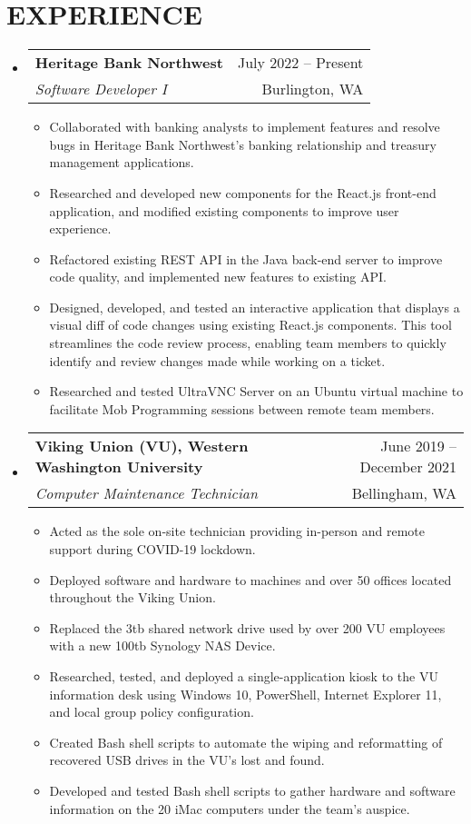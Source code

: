 \documentclass[letterpaper,11pt]{article}
\makeatletter
\newcommand{\resumeItem}[1]{
  \item\small{
    {#1 \vspace{-1pt}}
  }
}
\newcommand{\resumeSubheading}[4]{
  \vspace{-1pt}\item
    \begin{tabular*}{\textwidth}[t]{l@{\extracolsep{\fill}}r}
      \textbf{#1} & {\color{dark-grey}\small #2}\vspace{1pt}\\ %
      \textit{#3} & {\color{dark-grey} \small #4}\\ %
    \end{tabular*}\vspace{-4pt}
}
\newcommand{\resumeSubHeadingListStart}{\begin{itemize}[leftmargin=0in, label={}]}
\newcommand{\resumeSubHeadingListEnd}{\end{itemize}}
\newcommand{\resumeItemListStart}{\begin{itemize}}
\newcommand{\resumeItemListEnd}{\end{itemize}\vspace{0pt}}
\makeatother
\begin{document}
\section{EXPERIENCE}
  \resumeSubHeadingListStart

    \resumeSubheading
      {Heritage Bank Northwest}{July 2022 -- Present}
      {Software Developer I}{Burlington, WA}
     \resumeItemListStart
        \resumeItem{Collaborated with banking analysts to implement features and resolve bugs in Heritage Bank Northwest's banking relationship and treasury management applications.}
        \resumeItem{Researched and developed new components for the React.js front-end application, and modified existing components to improve user experience.}
        \resumeItem{Refactored existing REST API in the Java back-end server to improve code quality, and implemented new features to existing API.}
        \resumeItem{Designed, developed, and tested an interactive application that displays a visual diff of code changes using existing React.js components. This tool streamlines the code review process, enabling team members to quickly identify and review changes made while working on a ticket.}
        \resumeItem{Researched and tested UltraVNC Server on an Ubuntu virtual machine to facilitate Mob Programming sessions between remote team members.}
     \resumeItemListEnd

    \resumeSubheading
      {Viking Union (VU), Western Washington University}{June 2019 -- December 2021}
      {Computer Maintenance Technician}{Bellingham, WA}
      \resumeItemListStart
        \resumeItem{Acted as the sole on-site technician providing in-person and remote support during COVID-19 lockdown.}
        \resumeItem{Deployed software and hardware to machines and over 50 offices located throughout the Viking Union.}
        \resumeItem{Replaced the 3tb shared network drive used by over 200 VU employees with a new 100tb Synology NAS Device.}
        \resumeItem{Researched, tested, and deployed a single-application kiosk to the VU information desk using Windows 10, PowerShell, Internet Explorer 11, and local group policy configuration.}
        \resumeItem{Created Bash shell scripts to automate the wiping and reformatting of recovered USB drives in the VU’s lost and found.}
        \resumeItem{Developed and tested Bash shell scripts to gather hardware and software information on the 20 iMac computers under the team's auspice.}
      \resumeItemListEnd

  \resumeSubHeadingListEnd
\end{document}
